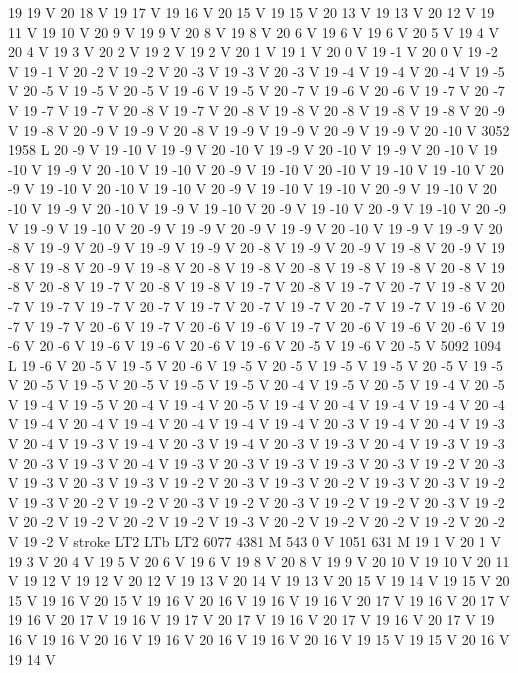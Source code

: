 {{19 19 V
20 18 V
19 17 V
19 16 V
20 15 V
19 15 V
20 13 V
19 13 V
20 12 V
19 11 V
19 10 V
20 9 V
19 9 V
20 8 V
19 8 V
20 6 V
19 6 V
19 6 V
20 5 V
19 4 V
20 4 V
19 3 V
20 2 V
19 2 V
19 2 V
20 1 V
19 1 V
20 0 V
19 -1 V
20 0 V
19 -2 V
19 -1 V
20 -2 V
19 -2 V
20 -3 V
19 -3 V
20 -3 V
19 -4 V
19 -4 V
20 -4 V
19 -5 V
20 -5 V
19 -5 V
20 -5 V
19 -6 V
19 -5 V
20 -7 V
19 -6 V
20 -6 V
19 -7 V
20 -7 V
19 -7 V
19 -7 V
20 -8 V
19 -7 V
20 -8 V
19 -8 V
20 -8 V
19 -8 V
19 -8 V
20 -9 V
19 -8 V
20 -9 V
19 -9 V
20 -8 V
19 -9 V
19 -9 V
20 -9 V
19 -9 V
20 -10 V
3052 1958 L
20 -9 V
19 -10 V
19 -9 V
20 -10 V
19 -9 V
20 -10 V
19 -9 V
20 -10 V
19 -10 V
19 -9 V
20 -10 V
19 -10 V
20 -9 V
19 -10 V
20 -10 V
19 -10 V
19 -10 V
20 -9 V
19 -10 V
20 -10 V
19 -10 V
20 -9 V
19 -10 V
19 -10 V
20 -9 V
19 -10 V
20 -10 V
19 -9 V
20 -10 V
19 -9 V
19 -10 V
20 -9 V
19 -10 V
20 -9 V
19 -10 V
20 -9 V
19 -9 V
19 -10 V
20 -9 V
19 -9 V
20 -9 V
19 -9 V
20 -10 V
19 -9 V
19 -9 V
20 -8 V
19 -9 V
20 -9 V
19 -9 V
19 -9 V
20 -8 V
19 -9 V
20 -9 V
19 -8 V
20 -9 V
19 -8 V
19 -8 V
20 -9 V
19 -8 V
20 -8 V
19 -8 V
20 -8 V
19 -8 V
19 -8 V
20 -8 V
19 -8 V
20 -8 V
19 -7 V
20 -8 V
19 -8 V
19 -7 V
20 -8 V
19 -7 V
20 -7 V
19 -8 V
20 -7 V
19 -7 V
19 -7 V
20 -7 V
19 -7 V
20 -7 V
19 -7 V
20 -7 V
19 -7 V
19 -6 V
20 -7 V
19 -7 V
20 -6 V
19 -7 V
20 -6 V
19 -6 V
19 -7 V
20 -6 V
19 -6 V
20 -6 V
19 -6 V
20 -6 V
19 -6 V
19 -6 V
20 -6 V
19 -6 V
20 -5 V
19 -6 V
20 -5 V
5092 1094 L
19 -6 V
20 -5 V
19 -5 V
20 -6 V
19 -5 V
20 -5 V
19 -5 V
19 -5 V
20 -5 V
19 -5 V
20 -5 V
19 -5 V
20 -5 V
19 -5 V
19 -5 V
20 -4 V
19 -5 V
20 -5 V
19 -4 V
20 -5 V
19 -4 V
19 -5 V
20 -4 V
19 -4 V
20 -5 V
19 -4 V
20 -4 V
19 -4 V
19 -4 V
20 -4 V
19 -4 V
20 -4 V
19 -4 V
20 -4 V
19 -4 V
19 -4 V
20 -3 V
19 -4 V
20 -4 V
19 -3 V
20 -4 V
19 -3 V
19 -4 V
20 -3 V
19 -4 V
20 -3 V
19 -3 V
20 -4 V
19 -3 V
19 -3 V
20 -3 V
19 -3 V
20 -4 V
19 -3 V
20 -3 V
19 -3 V
19 -3 V
20 -3 V
19 -2 V
20 -3 V
19 -3 V
20 -3 V
19 -3 V
19 -2 V
20 -3 V
19 -3 V
20 -2 V
19 -3 V
20 -3 V
19 -2 V
19 -3 V
20 -2 V
19 -2 V
20 -3 V
19 -2 V
20 -3 V
19 -2 V
19 -2 V
20 -3 V
19 -2 V
20 -2 V
19 -2 V
20 -2 V
19 -2 V
19 -3 V
20 -2 V
19 -2 V
20 -2 V
19 -2 V
20 -2 V
19 -2 V
stroke
LT2
LTb
LT2
6077 4381 M
543 0 V
1051 631 M
19 1 V
20 1 V
19 3 V
20 4 V
19 5 V
20 6 V
19 6 V
19 8 V
20 8 V
19 9 V
20 10 V
19 10 V
20 11 V
19 12 V
19 12 V
20 12 V
19 13 V
20 14 V
19 13 V
20 15 V
19 14 V
19 15 V
20 15 V
19 16 V
20 15 V
19 16 V
20 16 V
19 16 V
19 16 V
20 17 V
19 16 V
20 17 V
19 16 V
20 17 V
19 16 V
19 17 V
20 17 V
19 16 V
20 17 V
19 16 V
20 17 V
19 16 V
19 16 V
20 16 V
19 16 V
20 16 V
19 16 V
20 16 V
19 15 V
19 15 V
20 16 V
19 14 V
}}
